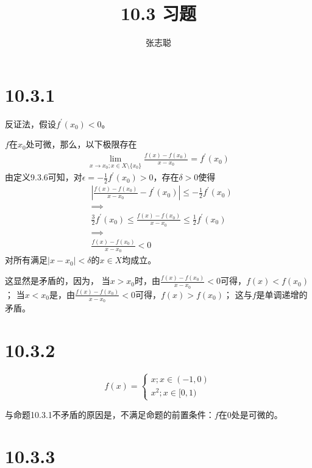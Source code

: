 \documentclass{article}
\begin{document}
\title{10.3 习题}
\author{张志聪}
\maketitle

\section*{10.3.1}


反证法，假设$f^\prime(x_0) < 0$。

$f$在$x_0$处可微，那么，以下极限存在
\begin{align*}
  \lim\limits_{x \to x_0; x \in X \setminus \{x_0\}} \frac{f(x) - f(x_0)}{x - x_0} = f^\prime(x_0)
\end{align*}
由定义9.3.6可知，对$\epsilon = -\frac{1}{2}f^\prime(x_0) > 0$，存在$\delta > 0$使得
\begin{align*}
   & \left|\frac{f(x) - f(x_0)}{x - x_0} - f^\prime(x_0) \right| \leq -\frac{1}{2}f^\prime(x_0) \\
   & \implies                                                                                   \\
   & \frac{3}{2}f^\prime(x_0) \leq \frac{f(x) - f(x_0)}{x - x_0} \leq \frac{1}{2}f^\prime(x_0)  \\
   & \implies                                                                                   \\
   & \frac{f(x) - f(x_0)}{x - x_0} < 0
\end{align*}
对所有满足$|x - x_0| < \delta$的$x \in X$均成立。

这显然是矛盾的，因为，
当$x > x_0$时，由$\frac{f(x) - f(x_0)}{x - x_0} < 0$可得，$f(x) < f(x_0)$；
当$x < x_0$是，由$\frac{f(x) - f(x_0)}{x - x_0} < 0$可得，$f(x) > f(x_0)$；
这与$f$是单调递增的矛盾。

\section*{10.3.2}

\begin{equation*}
  f(x)=
  \begin{cases*}
    x; x \in (-1, 0) \\
    x^2; x \in [0, 1)
  \end{cases*}
\end{equation*}

与命题10.3.1不矛盾的原因是，不满足命题的前置条件：$f$在$0$处是可微的。

\section*{10.3.3}
\end{document}
